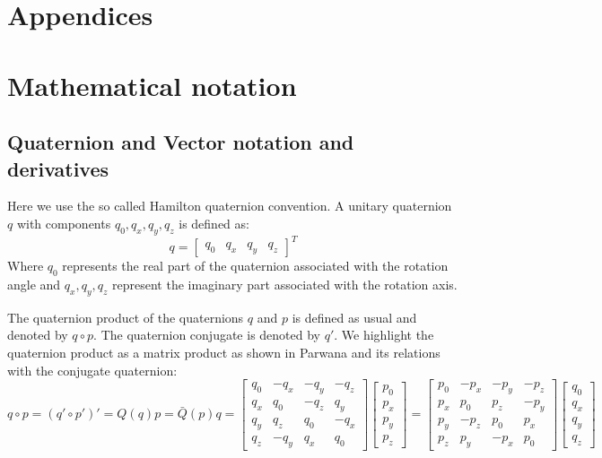 \appendix

\section*{Appendices}

\section{Mathematical notation}
\subsection{Quaternion and Vector notation and derivatives}
Here we use the so called Hamilton quaternion convention. A unitary quaternion $q$ with components $q_0, q_x, q_y, q_z$ is defined as:
\begin{equation}
 q = 
 \left[ \begin{matrix}
 q_0 & q_x & q_y & q_z
 \end{matrix}  \right]^T
\end{equation}
Where $q_0$ represents the real part of the quaternion associated with the rotation angle and $q_x, q_y, q_z$ represent the imaginary part associated with the rotation axis.

The quaternion product of the quaternions $q$ and $p$ is defined as usual and denoted by $q \circ p$. The quaternion conjugate is denoted by $q'$. We highlight the quaternion product as a matrix product as shown in Parwana \cite{parwana2017quaternion} and its relations with the conjugate quaternion:
\begin{equation}
q \circ p = (q' \circ p')' = Q(q) p = \bar{Q}(p) q 
= 
\left[\begin{matrix}
  q_0 & -q_x & -q_y & -q_z \\
  q_x & q_0 & -q_z & q_y \\
  q_y & q_z & q_0 & -q_x \\
  q_z & -q_y & q_x & q_0 
\end{matrix}\right]
 \left[ \begin{matrix}
p_0 \\ p_x \\ p_y \\ p_z
\end{matrix}  \right]
=
\left[\begin{matrix}
p_0 & -p_x & -p_y & -p_z \\
p_x & p_0 & p_z & -p_y \\
p_y & -p_z & p_0 & p_x \\
p_z & p_y & -p_x & p_0 
\end{matrix}\right]
\left[ \begin{matrix}
q_0 \\ q_x \\ q_y \\ q_z
\end{matrix}  \right]
\end{equation}

